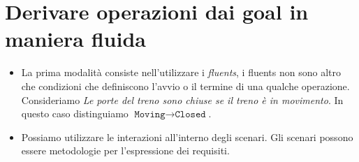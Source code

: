 \section{Derivare operazioni dai goal in maniera fluida}
\begin{itemize}
    \item La prima modalità consiste nell'utilizzare i \textit{fluents},
    i fluents non sono altro che condizioni che definiscono l'avvio o il 
    termine di una qualche operazione.
    Consideriamo \textit{Le porte del treno sono chiuse se il treno è in movimento}.
    In questo caso distinguiamo $\texttt{Moving} \rightarrow \texttt{Closed}$.
    \item Possiamo utilizzare le interazioni all'interno degli scenari. Gli 
    scenari possono essere metodologie per l'espressione dei requisiti.
    \begin{figure}[H]
        \centering
\end{figure}
\end{itemize}
